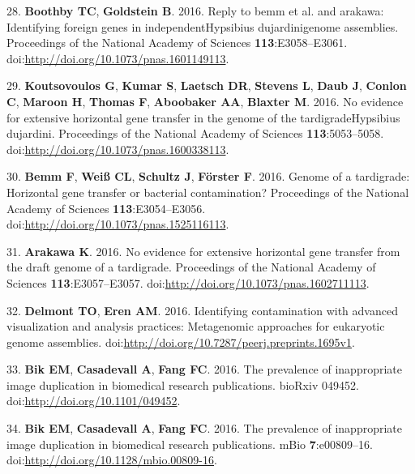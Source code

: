 \documentclass[11pt,]{article}
\begin{document}
28. \textbf{Boothby TC}, \textbf{Goldstein B}. 2016. Reply to bemm et
al. and arakawa: Identifying foreign genes in independentHypsibius
dujardinigenome assemblies. Proceedings of the National Academy of
Sciences \textbf{113}:E3058--E3061.
doi:\url{http://doi.org/10.1073/pnas.1601149113}.

29. \textbf{Koutsovoulos G}, \textbf{Kumar S}, \textbf{Laetsch DR},
\textbf{Stevens L}, \textbf{Daub J}, \textbf{Conlon C}, \textbf{Maroon
H}, \textbf{Thomas F}, \textbf{Aboobaker AA}, \textbf{Blaxter M}. 2016.
No evidence for extensive horizontal gene transfer in the genome of the
tardigradeHypsibius dujardini. Proceedings of the National Academy of
Sciences \textbf{113}:5053--5058.
doi:\url{http://doi.org/10.1073/pnas.1600338113}.

30. \textbf{Bemm F}, \textbf{Weiß CL}, \textbf{Schultz J},
\textbf{Förster F}. 2016. Genome of a tardigrade: Horizontal gene
transfer or bacterial contamination? Proceedings of the National Academy
of Sciences \textbf{113}:E3054--E3056.
doi:\url{http://doi.org/10.1073/pnas.1525116113}.

31. \textbf{Arakawa K}. 2016. No evidence for extensive horizontal gene
transfer from the draft genome of a tardigrade. Proceedings of the
National Academy of Sciences \textbf{113}:E3057--E3057.
doi:\url{http://doi.org/10.1073/pnas.1602711113}.

32. \textbf{Delmont TO}, \textbf{Eren AM}. 2016. Identifying
contamination with advanced visualization and analysis practices:
Metagenomic approaches for eukaryotic genome assemblies.
doi:\url{http://doi.org/10.7287/peerj.preprints.1695v1}.

33. \textbf{Bik EM}, \textbf{Casadevall A}, \textbf{Fang FC}. 2016. The
prevalence of inappropriate image duplication in biomedical research
publications. bioRxiv 049452. doi:\url{http://doi.org/10.1101/049452}.

34. \textbf{Bik EM}, \textbf{Casadevall A}, \textbf{Fang FC}. 2016. The
prevalence of inappropriate image duplication in biomedical research
publications. mBio \textbf{7}:e00809--16.
doi:\url{http://doi.org/10.1128/mbio.00809-16}.
\end{document}
